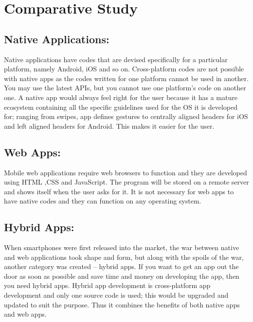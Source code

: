 \documentclass[14pt,a4paper,final]{extreport}
\begin{document}
 

\chapter{Comparative Study}
\section{Native Applications:}
 
\item
Native applications have codes that are devised specifically for a particular platform, namely Android, iOS and so on. Cross-platform codes are not possible with native apps as the codes written for one platform cannot be used in another. You may use the latest APIs, but you cannot use one platform’s code on another one. A native app would always feel right for the user because it has a mature ecosystem containing all the specific guidelines used for the OS it is developed for; ranging from swipes, app defines gestures to centrally aligned headers for iOS and left aligned headers for Android. This makes it easier for the user.
\section{Web Apps:}
\item 
Mobile web applications require web browsers to function and they are developed using HTML ,CSS and JavaScript. The program will be stored on a remote server and shows itself when the user asks for it. It is not necessary for web apps to have native codes and they can function on any operating system.
\section{Hybrid Apps:}
\item When smartphones were first released into the market, the war between native and web applications took shape and form, but along with the spoils of the war, another category was created – hybrid apps. If you want to get an app out the door as soon as possible and save time and money on developing the app, then you need hybrid apps. Hybrid app development is cross-platform app development and only one source code is used; this would be upgraded and updated to suit the purpose. Thus it combines the benefits of both native apps and web apps.
\end{document}
